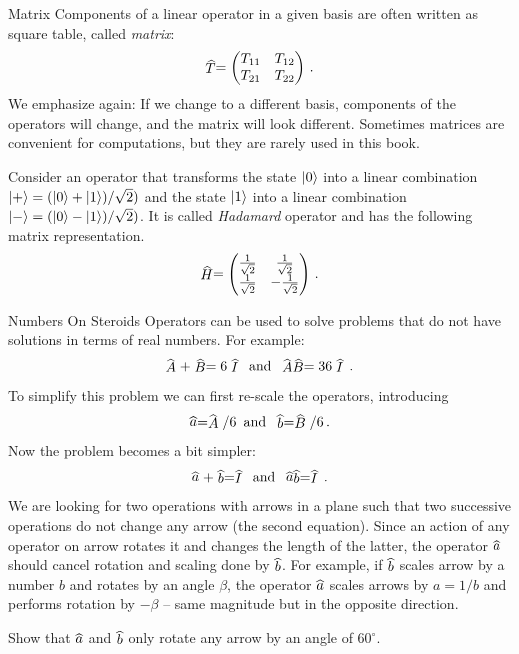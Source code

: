 \begin{mybio}{Matrix}
	Components of a linear operator in a given basis are often written as square table, called \emph{matrix}:
	\[
	\op{T} =
	\begin{pmatrix}
		T_{11} & T_{12}\\
		T_{21} & T_{22}
	\end{pmatrix}\,.
	\]
	We emphasize again: If we change to a different basis, components of the operators will change, and the matrix will look different. Sometimes matrices are convenient for computations, but they are rarely used in this book.
\end{mybio}

\begin{example}
	Consider an operator that transforms the state $|{0}\rangle$ into a linear combination $|{+}\rangle=(|{0}\rangle+|{1}\rangle)/\sqrt{2})$ and the state $|{1}\rangle$ into a linear combination $|{-}\rangle=(|{0}\rangle-|{1}\rangle)/\sqrt{2})$. It is called \emph{Hadamard} operator and has the following matrix representation.
	\[
	\op{H} =
	\begin{pmatrix}
		\frac{1}{\sqrt{2}} & \frac{1}{\sqrt{2}}\\
		\frac{1}{\sqrt{2}} & -\frac{1}{\sqrt{2}}
	\end{pmatrix}\,.
	\]
\end{example}

\begin{mybio}{Numbers On Steroids}
	Operators can be used to solve problems that do not have solutions in terms of real numbers. For example:
	\[
	\op{A}+\op{B} = 6\op{I}\,\textrm{ and }\, \op{A}\op{B}=36\op{I}\,.
	\]
	To simplify this problem we can first re-scale the operators, introducing
	\[
	\op{a} = \op{A} / 6\,\textrm{ and }\, \op{b} = \op{B}/6\,.
	\]
	Now the problem becomes a bit simpler:
	\[
	\op{a}+\op{b} = \op{I}\,\textrm{ and }\, \op{a}\op{b}=\op{I}\,.
	\]
	We are looking for two operations with arrows in a plane such that two successive operations do not change any arrow (the second equation). Since an action of any operator on arrow rotates it and changes the length of the latter, the operator $\op{a}$ should cancel rotation and scaling done by $\op{b}$. For example, if $\op{b}$ scales arrow by a number $b$ and rotates by an angle $\beta$, the operator $\op{a}$ scales arrows by $a=1/b$ and performs rotation by $-\beta$ -- same magnitude but in the opposite direction.
\end{mybio}
\begin{exercise}
	Show that $\op{a}$ and $\op{b}$ only rotate any arrow by an angle of $60^\circ$.
\end{exercise}

